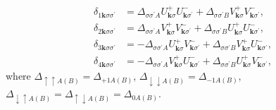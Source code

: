 \documentclass[aps,prb,showpacs,reprint]{revtex4-1}
\begin{document}
\begin{equation}
\begin{split}
 \delta_{1\mathbf{k}\sigma\sigma^{\prime}}&=\Delta_{\sigma\sigma^{\prime}
A}U^+_{\mathbf{k}\sigma}U^-_{\mathbf{k}\sigma^{\prime}}+\Delta_{\sigma\sigma^{
\prime}
B}V^+_{\mathbf{k}\sigma}V^-_{\mathbf{k}\sigma^{\prime}},\\
 \delta_{2\mathbf{k}\sigma\sigma^{\prime}}&=\Delta_{\sigma\sigma^{\prime}
A}V^+_{\mathbf{k}\sigma}V^-_{\mathbf{k}\sigma^{\prime}}+\Delta_{\sigma\sigma^{
\prime}
B}U^+_{\mathbf{k}\sigma}U^-_{\mathbf{k}\sigma^{\prime}},\\
 \delta_{3\mathbf{k}\sigma\sigma^{\prime}}&=-\Delta_{\sigma\sigma^{\prime}
A}U^+_{\mathbf{k}\sigma}V^-_{\mathbf{k}\sigma^{\prime}}+\Delta_{\sigma\sigma^{
\prime}
B}V^+_{\mathbf{k}\sigma}U^-_{\mathbf{k}\sigma^{\prime}},\\
 \delta_{4\mathbf{k}\sigma\sigma^{\prime}}&=-\Delta_{\sigma\sigma^{\prime}
A}V^+_{\mathbf{k}\sigma}U^-_{\mathbf{k}\sigma^{\prime}}+\Delta_{\sigma\sigma^{
\prime}
B}U^+_{\mathbf{k}\sigma}V^-_{\mathbf{k}\sigma^{\prime}},
\end{split}
\end{equation}
where $\Delta_{\uparrow\uparrow A(B)}=\Delta_{+1A(B)}$,
$\Delta_{\downarrow\downarrow A(B)}=\Delta_{-1A(B)}$,
$\Delta_{\downarrow\uparrow A(B)}=\Delta_{\uparrow\downarrow
A(B)}=\Delta_{0A(B)}$. 
\end{document}
